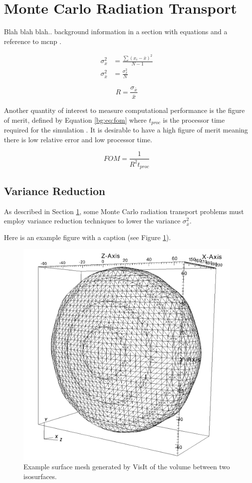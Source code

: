 \section{Monte Carlo Radiation Transport}
\label{sec:bg:mc}

Blah blah blah.. background information in a section with equations and a reference to \ac{mcnp} \cite{mcnp5-theory}.

\begin{equation}\label{bg:eq:std}
\begin{split}
	\sigma_x^2 &= \frac{\sum \left(x_i - \bar{x}\right)^2}{N-1} \\
	\sigma_{\bar{x}}^2 &= \frac{\sigma_x^2}{N}
\end{split}
\end{equation}

\begin{equation}\label{bg:eq:relerror}
	R = \frac{\sigma_{\bar{x}}}{\bar{x}}
\end{equation}

Another quantity of interest to measure computational performance is the figure of merit, defined by Equation \ref{bg:eq:fom} where $t_{proc}$ is the processor time required 
for the
simulation \cite{mcnp5-theory}. It is desirable to have a high figure of merit meaning there is low 
relative error and low processor time. 

\begin{equation}\label{bg:eq:fom}
	FOM = \frac{1}{R^2 t_{proc}}
\end{equation}

\subsection{Variance Reduction}
\label{sec:bg:vr}

As described in Section \ref{sec:bg:mc}, some Monte Carlo radiation 
transport problems must employ variance reduction techniques to lower the 
variance $\sigma_{\bar{x}}^2$.

Here is an example figure with a caption (see Figure \ref{fig:prep:isosurf-mesh}).
\begin{figure}[h!]
\centering
	\includegraphics[width=.5\textwidth]{./content/background/example-isosurf.png}
	\caption[Example VisIt surface mesh]{Example surface mesh generated by VisIt of the volume between two isosurfaces.
	\label{fig:prep:isosurf-mesh}}
\end{figure}

